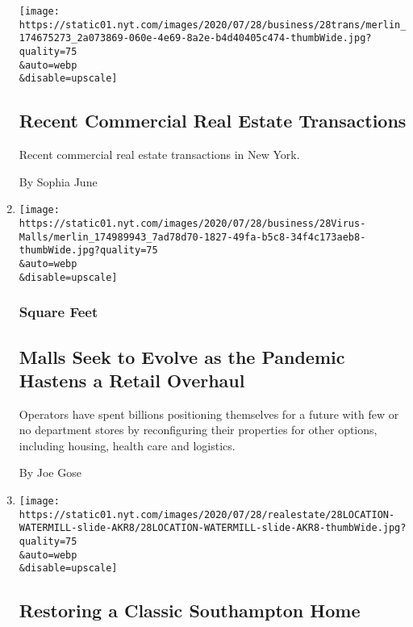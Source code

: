 \begin{enumerate}
  \texttt{[image: https://static01.nyt.com/images/2020/07/28/business/28trans/merlin\_174675273\_2a073869-060e-4e69-8a2e-b4d40405c474-thumbWide.jpg?quality=75\\\&auto=webp\\\&disable=upscale]}

  \hypertarget{recent-commercial-real-estate-transactions}{%
  \subsection{Recent Commercial Real Estate
  Transactions}\label{recent-commercial-real-estate-transactions}}

  Recent commercial real estate transactions in New York.

  By Sophia June
\item
  \href{/2020/07/28/business/malls-coronavirus.html}{}

  \texttt{[image: https://static01.nyt.com/images/2020/07/28/business/28Virus-Malls/merlin\_174989943\_7ad78d70-1827-49fa-b5c8-34f4c173aeb8-thumbWide.jpg?quality=75\\\&auto=webp\\\&disable=upscale]}

  \hypertarget{square-feet}{%
  \subsubsection{Square Feet}\label{square-feet}}

  \hypertarget{malls-seek-to-evolve-as-the-pandemic-hastens-a-retail-overhaul}{%
  \subsection{Malls Seek to Evolve as the Pandemic Hastens a Retail
  Overhaul}\label{malls-seek-to-evolve-as-the-pandemic-hastens-a-retail-overhaul}}

  Operators have spent billions positioning themselves for a future with
  few or no department stores by reconfiguring their properties for
  other options, including housing, health care and logistics.

  By Joe Gose
\item
  \href{/slideshow/2020/07/28/realestate/restoring-a-classic-southampton-home.html}{}

  \texttt{[image: https://static01.nyt.com/images/2020/07/28/realestate/28LOCATION-WATERMILL-slide-AKR8/28LOCATION-WATERMILL-slide-AKR8-thumbWide.jpg?quality=75\\\&auto=webp\\\&disable=upscale]}

  \hypertarget{restoring-a-classic-southampton-home}{%
  \subsection{Restoring a Classic Southampton
  Home}\label{restoring-a-classic-southampton-home}}


\end{enumerate}

